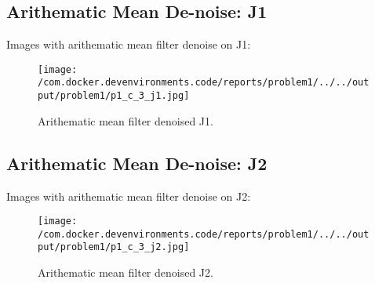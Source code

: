\documentclass{article}%
\begin{document}
%
\newpage%
\subsection{Arithematic Mean De{-}noise: J1}%
\label{subsec:ArithematicMeanDe{-}noiseJ1}%
Images with arithematic mean filter denoise on J1:%


\begin{figure}[h!]%
\centering%
\texttt{[image: /com.docker.devenvironments.code/reports/problem1/../../output/problem1/p1\_c\_3\_j1.jpg]}%
\caption{Arithematic mean filter denoised J1.}%
\end{figure}

%
\subsection{Arithematic Mean De{-}noise: J2}%
\label{subsec:ArithematicMeanDe{-}noiseJ2}%
Images with arithematic mean filter denoise on J2:%


\begin{figure}[h!]%
\centering%
\texttt{[image: /com.docker.devenvironments.code/reports/problem1/../../output/problem1/p1\_c\_3\_j2.jpg]}%
\caption{Arithematic mean filter denoised J2.}%
\end{figure}

%
\end{document}
